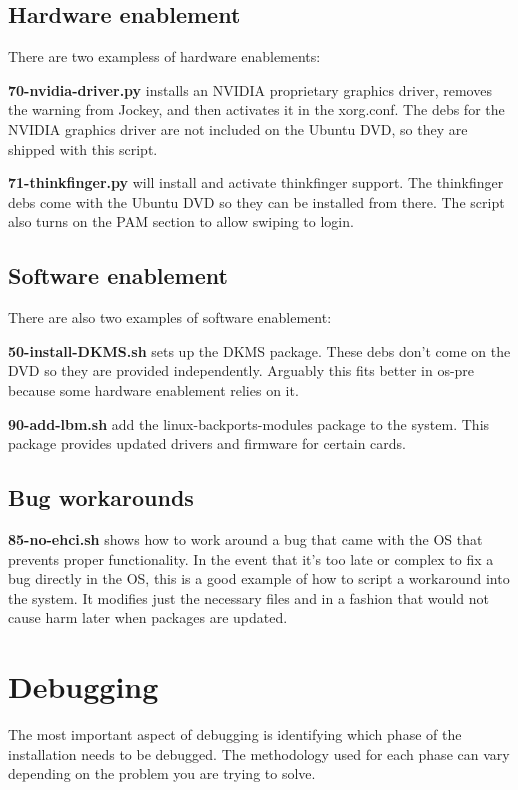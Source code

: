 \documentclass[letterpaper,10pt,titlepage]{article}
\begin{document}
\subsection{Hardware enablement}
There are two exampless of hardware enablements:
\begin{list}{}
\item \textbf{70-nvidia-driver.py} installs an NVIDIA proprietary graphics driver, removes the warning from Jockey, and then activates it in the xorg.conf.  The debs for the NVIDIA graphics driver are not included on the Ubuntu DVD, so they are shipped with this script.
\item \textbf{71-thinkfinger.py} will install and activate thinkfinger support.  The thinkfinger debs come with the Ubuntu DVD so they can be installed from there.  The script also turns on the PAM section to allow swiping to login.
\end{list}

\subsection{Software enablement}
There are also two examples of software enablement:
\begin{list}{}
\item \textbf{50-install-DKMS.sh} sets up the DKMS package.  These debs don't come on the DVD so they are provided independently.  Arguably this fits better in os-pre because some hardware enablement relies on it.
\item \textbf{90-add-lbm.sh} add the linux-backports-modules package to the system.  This package provides updated drivers and firmware for certain cards.
\end{list}

\subsection{Bug workarounds}
\textbf{85-no-ehci.sh} shows how to work around a bug that came with the OS that prevents proper functionality.  In the event that it's too late or complex to fix a bug directly in the OS, this is a good example of how to script a workaround into the system.  It modifies just the necessary files and in a fashion that would not cause harm later when packages are updated.

\section{Debugging}
The most important aspect of debugging is identifying which phase of the installation needs to be debugged.  The methodology used for each phase can vary depending on the problem you are trying to solve.
\end{document}
